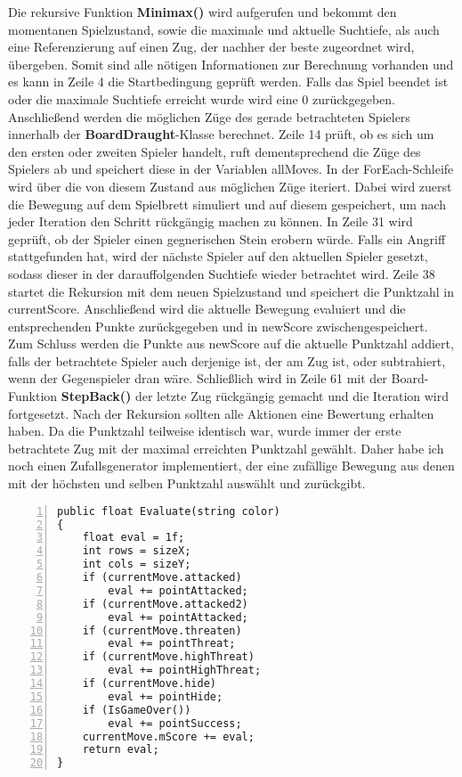 Die rekursive Funktion \textbf{Minimax()} wird aufgerufen und bekommt den momentanen Spielzustand, sowie die maximale und aktuelle Suchtiefe, als auch eine Referenzierung auf einen Zug, der nachher der beste zugeordnet wird, übergeben. Somit sind alle nötigen Informationen zur Berechnung vorhanden und es kann in Zeile 4 die Startbedingung geprüft werden. Falls das Spiel beendet ist oder die maximale Suchtiefe erreicht wurde wird eine 0 zurückgegeben. Anschließend werden die möglichen Züge des gerade betrachteten Spielers innerhalb der \textbf{BoardDraught}-Klasse berechnet. Zeile 14 prüft, ob es sich um den ersten oder zweiten Spieler handelt, ruft dementsprechend die Züge des Spielers ab und speichert diese in der Variablen allMoves. In der ForEach-Schleife wird über die von diesem Zustand aus möglichen Züge iteriert. Dabei wird zuerst die Bewegung auf dem Spielbrett simuliert und auf diesem gespeichert, um nach jeder Iteration den Schritt rückgängig machen zu können. In Zeile 31 wird geprüft, ob der Spieler einen gegnerischen Stein erobern würde. Falls ein Angriff stattgefunden hat, wird der nächste Spieler auf den aktuellen Spieler gesetzt, sodass dieser in der darauffolgenden Suchtiefe wieder betrachtet wird. Zeile 38 startet die Rekursion mit dem neuen Spielzustand und speichert die Punktzahl in currentScore. Anschließend wird die aktuelle Bewegung evaluiert und die entsprechenden Punkte zurückgegeben und in newScore zwischengespeichert. Zum Schluss werden die Punkte aus newScore auf die aktuelle Punktzahl addiert, falls der betrachtete Spieler auch derjenige ist, der am Zug ist, oder subtrahiert, wenn der Gegenspieler dran wäre. Schließlich wird in Zeile 61 mit der Board-Funktion \textbf{StepBack()} der letzte Zug rückgängig gemacht und die Iteration wird fortgesetzt. Nach der Rekursion sollten alle Aktionen eine Bewertung erhalten haben. Da die Punktzahl teilweise identisch war, wurde immer der erste betrachtete Zug mit der maximal erreichten Punktzahl gewählt. Daher habe ich noch einen Zufallsgenerator implementiert, der eine zufällige Bewegung aus denen mit der höchsten und selben Punktzahl auswählt und zurückgibt.\\
\begin{lstlisting}[basicstyle=\scriptsize\ttfamily, numbers=left, stepnumber=1, numberstyle = \tiny]
public float Evaluate(string color)
{
	float eval = 1f;
	int rows = sizeX;
	int cols = sizeY;
	if (currentMove.attacked)
		eval += pointAttacked;
	if (currentMove.attacked2)
		eval += pointAttacked;
	if (currentMove.threaten)
		eval += pointThreat;
	if (currentMove.highThreat)
		eval += pointHighThreat;
	if (currentMove.hide)
		eval += pointHide;
	if (IsGameOver())
		eval += pointSuccess;
	currentMove.mScore += eval;
	return eval;
}
\end{lstlisting}

